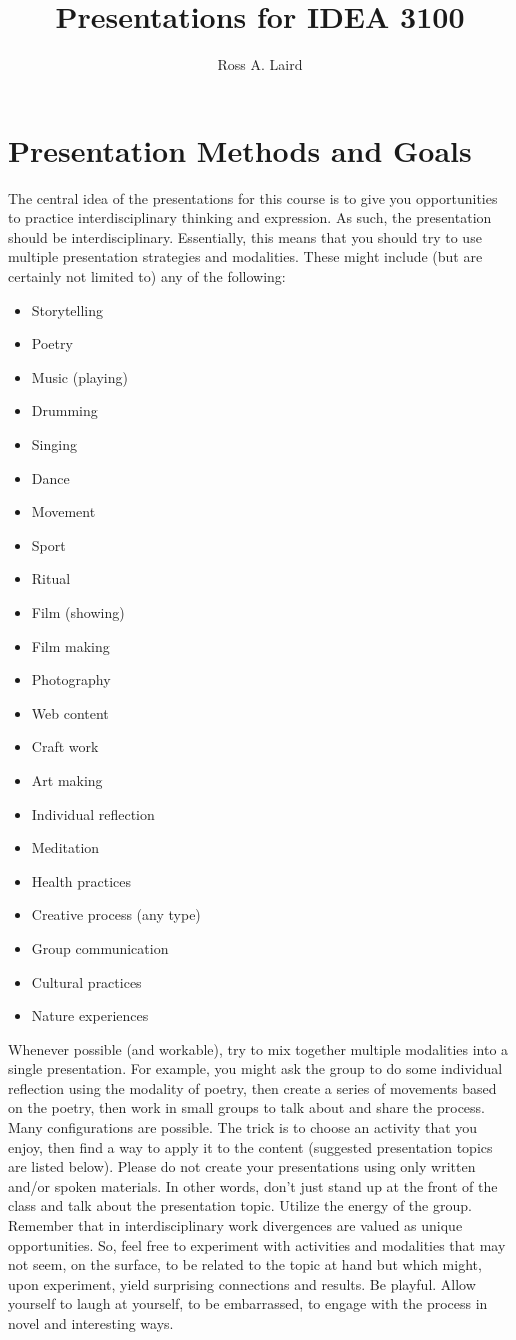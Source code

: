 \documentclass[letterpaper,oneside,11pt,draft]{memoir}
\title{\sffamily\Huge{Presentations for IDEA 3100}}
\author{Ross A. Laird}
\begin{document}
\pagestyle{idea}
\section{Presentation Methods and Goals}

The central idea of the presentations for this course is to give you
 opportunities to practice interdisciplinary thinking and expression.
 As such, the presentation should be interdisciplinary. Essentially,
 this means that you should try to use multiple presentation
 strategies and modalities. These might include (but are certainly not
 limited to) any of the following:

 \begin{itemize}
 \item Storytelling
 \item Poetry
 \item Music (playing)
 \item Drumming
 \item Singing
 \item Dance
 \item Movement
 \item Sport
 \item Ritual
 \item Film (showing)
 \item Film making
 \item Photography
 \item Web content
 \item Craft work
 \item Art making
 \item Individual reflection
 \item Meditation
 \item Health practices
 \item Creative process (any type)
 \item Group communication
 \item Cultural practices
 \item Nature experiences
 \end{itemize}

 Whenever possible (and workable), try to mix together multiple
 modalities into a single presentation. For example, you might ask the
 group to do some individual reflection using the modality of poetry,
 then create a series of movements based on the poetry, then work in
 small groups to talk about and share the process. Many configurations
 are possible. The trick is to choose an activity that you enjoy, then
 find a way to apply it to the content (suggested presentation topics
 are listed below). Please do not create your presentations using only
 written and/or spoken materials. In other words, don't just stand up
 at the front of the class and talk about the presentation topic.
 Utilize the energy of the group. Remember that in interdisciplinary
 work divergences are valued as unique opportunities. So, feel free to
 experiment with activities and modalities that may not seem, on the
 surface, to be related to the topic at hand but which might, upon
 experiment, yield surprising connections and results. Be playful.
 Allow yourself to laugh at yourself, to be embarrassed, to engage
 with the process in novel and interesting ways.
\end{document}
